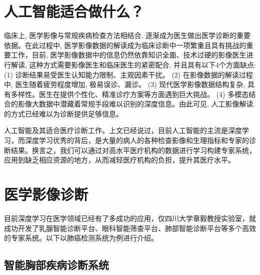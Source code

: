 \documentclass{xcumcmart}
\begin{document}
\section{人工智能适合做什么？}

\par 临床上, 医学影像与常规疾病检查方法相结合, 逐渐成为医生做出医学诊断的重要依据。在此过程中, 医学影像数据的解读成为临床诊断中一项繁重且具有挑战的重要工作，目前, 医学影像数据中的信息仍然依靠知识全面、技术过硬的影像医生进行解读, 这种方式需要影像医生和临床医生的紧密配合, 并且具有以下4个方面缺点: (1) 诊断结果易受医生认知能力限制、主观因素干扰。 (2) 在影像数据的解读过程中, 医生随着疲劳程度增加, 极易误诊、漏诊。 (3) 现代医学影像数据结构复杂, 具有多样性。医生在提供个性化、精准诊疗方案等方面遇到巨大挑战。 (4) 多模态结合的影像大数据中潜藏着常规手段难以识别的深度信息。由此可见, 人工影像解读的方式已经难以为诊断提供足够信息。\cite{2}
\par 人工智能及其适合医疗诊断工作。上文已经说过，目前人工智能的主流是深度学习，而深度学习优秀的背后，是大量的病人的各种检查影像和生理指标和专家的诊断结果。换言之，我们可以通过对高水平医疗机构的数据进行学习构建专家系统，应用到缺乏相应资源的地方，从而减轻医疗机构的负担，提升其医疗水平。
\section{医学影像诊断}
\par 目前深度学习在医学领域已经有了多成功的应用，仅四川大学章毅教授实验室，就成功开发了乳腺智能诊断平台、眼科智能筛查平台、肺部智能诊断平台等多个高效的专家系统。以下以肺癌检测系统为例进行介绍。
\subsection{智能胸部疾病诊断系统}
\end{document}
